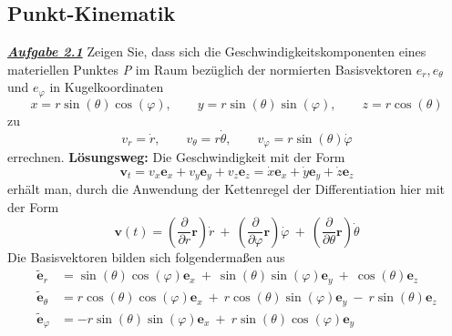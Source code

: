 \documentclass[a4paper,12p]{article}
\begin{document}
\subsection{Punkt-Kinematik}
\textbf{\textit{\underline{Aufgabe 2.1}}}
\newline\newline
 Zeigen Sie, dass sich die Geschwindigkeitskomponenten eines materiellen Punktes \textit{P} im Raum bezüglich der normierten Basisvektoren $ e_{r} , e_{\theta} $ und $ e_{\varphi} $ in Kugelkoordinaten
 \begin{equation*}
 	x = r\sin(\theta)\cos(\varphi),\qquad y = r\sin(\theta)\sin(\varphi),\qquad z = r\cos(\theta)
 \end{equation*}
 zu
 \begin{equation*}
 	v_{r} = \dot{r},\qquad v_{\theta} = r\dot{\theta},\qquad v_{\varphi} = r\sin(\theta)\dot{\varphi}
 \end{equation*}
 errechnen.
 \newline\newline
 \textbf{Lösungsweg:}
 \newline\newline
 Die Geschwindigkeit mit der Form
 \begin{equation*}
 	\textbf{v}_{t} = v_{x}\textbf{e}_{x} + v_{y}\textbf{e}_{y} + v_{z}\textbf{e}_{z} = \dot{x}\textbf{e}_{x} + \dot{y}\textbf{e}_{y} + \dot{z}\textbf{e}_{z}
 \end{equation*}
 erhält man, durch die Anwendung der Kettenregel der Differentiation hier mit der Form
 \begin{equation*}
 	\textbf{v}(t) = \left(\frac{\partial}{\partial r}\textbf{r}\right) \dot{r} \ + \ \left(\frac{\partial}{\partial \varphi}\textbf{r}\right)  \dot{\varphi} \ + \ \left(\frac{\partial}{\partial \theta}\textbf{r}\right)\dot{\theta}
 \end{equation*}
 Die Basisvektoren bilden sich folgendermaßen aus
 \begin{align*}
 	\tilde{\textbf{e}}_{r} & = \sin(\theta)\cos(\varphi)\textbf{e}_{x} \ + \ \sin(\theta)\sin(\varphi)\textbf{e}_{y} \ + \ \cos(\theta)\textbf{e}_{z} \\ 
 	\tilde{\textbf{e}}_{\theta} & = r\cos(\theta)\cos(\varphi)\textbf{e}_{x} \ + \ r\cos(\theta)\sin(\varphi)\textbf{e}_{y} \ - \ r\sin(\theta)\textbf{e}_{z} \\
 	\tilde{\textbf{e}}_{\varphi} & = -r\sin(\theta)\sin(\varphi)\textbf{e}_{x} \ + \ r\sin(\theta)\cos(\varphi)\textbf{e}_{y} 	
 \end{align*}
\end{document}
